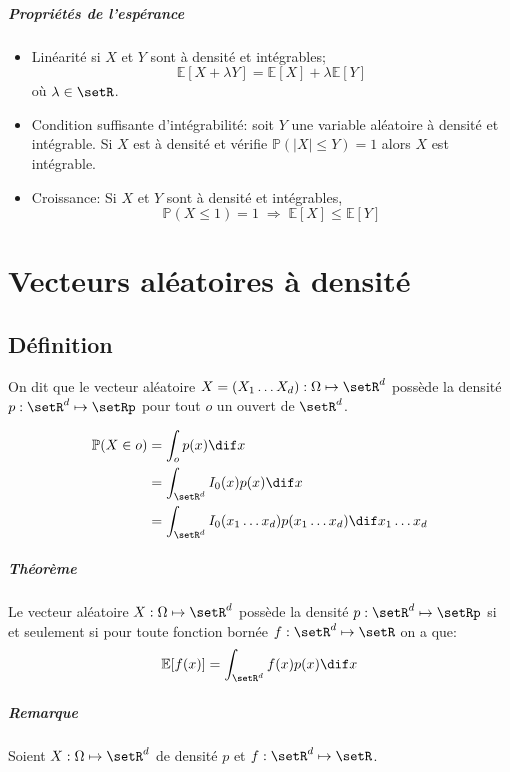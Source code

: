 \documentclass[a4paper,10pt,french,openany]{memoir}
\newcommand{\Proba}{\mathbb{P}}
\newcommand{\Esper}{\mathbb{E}}
\newcommand{\implique}{\Rightarrow}
\newcommand{\abs}[1]{\lvert #1 \rvert}
\newcommand{\xoned}{x_1\dots x_d}
\newcommand{\Xoned}{X_1\dots X_d}
\begin{document}
\paragraph{Propriétés de l'espérance}
\begin{itemize}
 \item Linéarité si $X$ et $Y$ sont à densité et intégrables; \[\Esper[X+\lambda Y] = \Esper[X] + \lambda \Esper[Y]\]
 où $\lambda \in \setR$.
 
 \item Condition suffisante d'intégrabilité: soit $Y$ une variable aléatoire à densité et intégrable. Si $X$ est à densité et vérifie $\Proba(\abs{X}\leq Y)=1$ alors $X$ est intégrable.
 
 \item Croissance: Si $X$ et $Y$ sont à densité et intégrables, \[\Proba(X\leq1) = 1 \;\implique\; \Esper[X] \leq \Esper[Y]\]
\end{itemize}

\chapter{Vecteurs aléatoires à densité}

\section{Définition}

On dit que le vecteur aléatoire $X = (\Xoned): \Omega \mapsto \setR^d$ possède la densité $p: \setR^d \mapsto \setRp$ pour tout $o$ un ouvert de $\setR^d$.

\begin{align*}
 \Proba(X\in o) &= \int_o p(x) \dif x \\
 &= \int_{\setR^d} I_0(x) p(x) \dif x \\
 &= \int_{\setR^d} I_0(\xoned) p(\xoned) \dif \xoned
\end{align*}

\paragraph{Théorème}
Le vecteur aléatoire $X:\Omega \mapsto \setR^d$ possède la densité $p:\setR^d \mapsto \setRp$ si et seulement si pour toute fonction bornée $f:\setR^d \mapsto \setR$ on a que: \[\Esper[f(x)]=\int_{\setR^d}f(x)p(x) \dif x\]

\paragraph{Remarque}
Soient $X:\Omega \mapsto \setR^d$ de densité $p$ et $f:\setR^d \mapsto \setR$.
\end{document}
